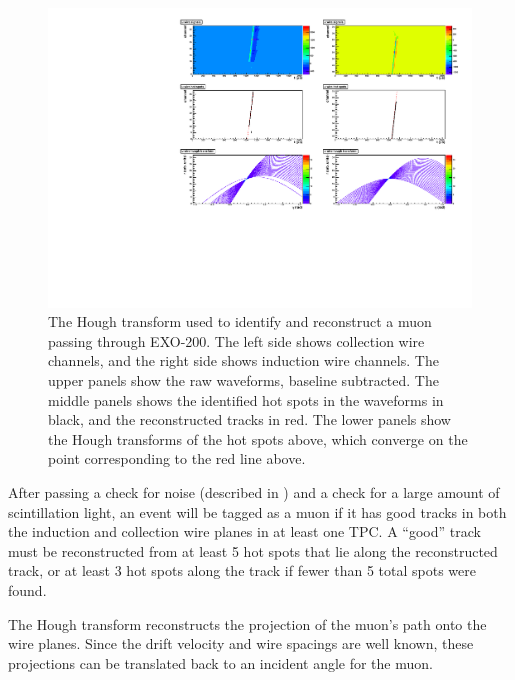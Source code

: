 \documentclass[herrin-thesis.tex]{subfiles}
\begin{document}
\begin{figure}[htbp]
\centering
\includegraphics[width=1\columnwidth]{./plots/muon_houghtransform_run_4685_ev_67.pdf}
\caption[Identifying a muon with the Hough transform]{The Hough transform used to identify and reconstruct a muon passing through EXO-200. The left side shows collection wire channels, and the right side shows induction wire channels. The upper panels show the raw waveforms, baseline subtracted. The middle panels shows the identified hot spots in the waveforms in black, and the reconstructed tracks in red. The lower panels show the Hough transforms of the hot spots above, which converge on the point corresponding to the red line above.}
\label{fig:muon:houghtransform}
\end{figure}

After passing a check for noise (described in ) and a check for a large amount of scintillation light, an event will be tagged as a muon if it has good tracks in both the induction and collection wire planes in at least one TPC. A ``good'' track must be reconstructed from at least 5 hot spots that lie along the reconstructed track, or at least 3 hot spots along the track if fewer than 5 total spots were found.

The Hough transform reconstructs the projection of the muon's path onto the wire planes. Since the drift velocity and wire spacings are well known, these projections can be translated back to an incident angle for the muon.
\end{document}
